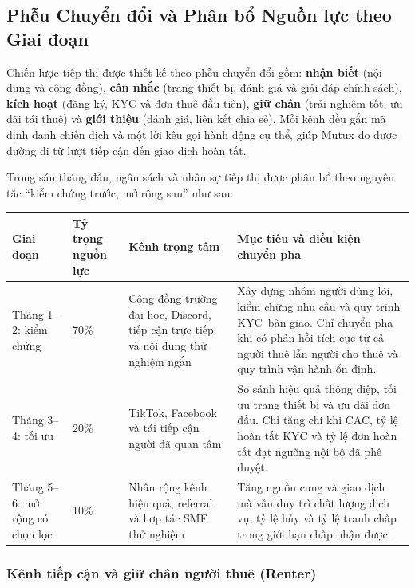 \subsection{Phễu Chuyển đổi và Phân bổ Nguồn lực theo Giai đoạn}

Chiến lược tiếp thị được thiết kế theo phễu chuyển đổi gồm: \textbf{nhận biết} (nội dung và cộng đồng), \textbf{cân nhắc} (trang thiết bị, đánh giá và giải đáp chính sách), \textbf{kích hoạt} (đăng ký, KYC và đơn thuê đầu tiên), \textbf{giữ chân} (trải nghiệm tốt, ưu đãi tái thuê) và \textbf{giới thiệu} (đánh giá, liên kết chia sẻ). Mỗi kênh đều gắn mã định danh chiến dịch và một lời kêu gọi hành động cụ thể, giúp Mutux đo được đường đi từ lượt tiếp cận đến giao dịch hoàn tất.

Trong sáu tháng đầu, ngân sách và nhân sự tiếp thị được phân bổ theo nguyên tắc ``kiểm chứng trước, mở rộng sau'' như sau:

\begin{longtable}{@{}p{}p{}p{}p{}@{}}
\toprule
\textbf{Giai đoạn} & \textbf{Tỷ trọng nguồn lực} & \textbf{Kênh trọng tâm} & \textbf{Mục tiêu và điều kiện chuyển pha} \\
\midrule
\endhead
Tháng 1--2: kiểm chứng & 70\% & Cộng đồng trường đại học, Discord, tiếp cận trực tiếp và nội dung thử nghiệm ngắn & Xây dựng nhóm người dùng lõi, kiểm chứng nhu cầu và quy trình KYC--bàn giao. Chỉ chuyển pha khi có phản hồi tích cực từ cả người thuê lẫn người cho thuê và quy trình vận hành ổn định. \\
Tháng 3--4: tối ưu & 20\% & TikTok, Facebook và tái tiếp cận người đã quan tâm & So sánh hiệu quả thông điệp, tối ưu trang thiết bị và ưu đãi đơn đầu. Chỉ tăng chi khi CAC, tỷ lệ hoàn tất KYC và tỷ lệ đơn hoàn tất đạt ngưỡng nội bộ đã phê duyệt. \\
Tháng 5--6: mở rộng có chọn lọc & 10\% & Nhân rộng kênh hiệu quả, referral và hợp tác SME thử nghiệm & Tăng nguồn cung và giao dịch mà vẫn duy trì chất lượng dịch vụ, tỷ lệ hủy và tỷ lệ tranh chấp trong giới hạn chấp nhận được. \\
\bottomrule
\end{longtable}

\subsubsection{Kênh tiếp cận và giữ chân người thuê (Renter)}

